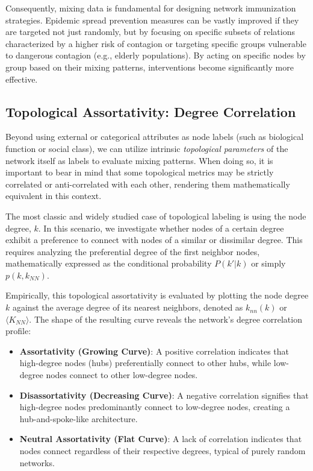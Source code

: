 Consequently, mixing data is fundamental for designing network immunization strategies. Epidemic spread prevention measures can be vastly improved if they are targeted not just randomly, but by focusing on specific subsets of relations characterized by a higher risk of contagion or targeting specific groups vulnerable to dangerous contagion (e.g., elderly populations). By acting on specific nodes by group based on their mixing patterns, interventions become significantly more effective.

\subsection{Topological Assortativity: Degree Correlation}
\label{subsec:topological_assortativity}

Beyond using external or categorical attributes as node labels (such as biological function or social class), we can utilize intrinsic \textit{topological parameters} of the network itself as labels to evaluate mixing patterns. When doing so, it is important to bear in mind that some topological metrics may be strictly correlated or anti-correlated with each other, rendering them mathematically equivalent in this context.

The most classic and widely studied case of topological labeling is using the node degree, $k$. In this scenario, we investigate whether nodes of a certain degree exhibit a preference to connect with nodes of a similar or dissimilar degree. This requires analyzing the preferential degree of the first neighbor nodes, mathematically expressed as the conditional probability $P(k'|k)$ or simply $p(k, k_{NN})$.

Empirically, this topological assortativity is evaluated by plotting the node degree $k$ against the average degree of its nearest neighbors, denoted as $k_{nn}(k)$ or $\langle K_{NN} \rangle$. The shape of the resulting curve reveals the network's degree correlation profile:
\begin{itemize}
    \item \textbf{Assortativity (Growing Curve)}: A positive correlation indicates that high-degree nodes (hubs) preferentially connect to other hubs, while low-degree nodes connect to other low-degree nodes.
    \item \textbf{Disassortativity (Decreasing Curve)}: A negative correlation signifies that high-degree nodes predominantly connect to low-degree nodes, creating a hub-and-spoke-like architecture.
    \item \textbf{Neutral Assortativity (Flat Curve)}: A lack of correlation indicates that nodes connect regardless of their respective degrees, typical of purely random networks.
\end{itemize}


